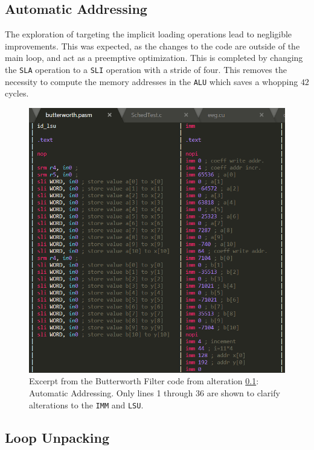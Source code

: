 \documentclass[letterpaper, 10 pt, conference]{ieeeconf}  %
\begin{document}
\subsection{Automatic Addressing}
\label{imp:C}

The exploration of targeting the implicit loading operations lead to negligible improvements. This was expected, as the changes to the code are outside of the main loop, and act as a preemptive optimization. This is completed by changing the \texttt{SLA} operation to a \texttt{SLI} operation with a stride of four. This removes the necessity to compute the memory addresses in the \texttt{ALU} which saves a whopping $42$ cycles.

\begin{figure}[h]
\begin{center}
\includegraphics[scale=0.35]{images/assem01.png}
\caption{Excerpt from the Butterworth Filter code from alteration \ref{imp:C}: Automatic Addressing. Only lines 1 through 36 are shown to clarify alterations to the \texttt{IMM} and \texttt{LSU}.}
\label{fig:assem01}
\end{center}
\end{figure}

\subsection{Loop Unpacking}
\label{imp:D}
\end{document}
